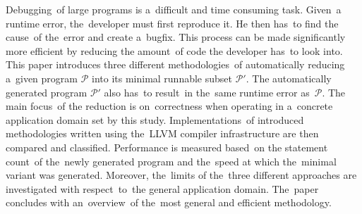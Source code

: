 \documentclass[12pt]{report}
\begin{document}

Debugging~of large programs is a~difficult and time consuming task.
Given~a runtime error, the~developer must first reproduce it. 
He then has~to find the cause~of the~error and create a~bugfix.
This process can be made significantly more efficient by reducing 
the amount~of code the developer has~to look into. 
This paper introduces three different methodologies~of automatically reducing
a~given program $\mathcal{P}$ into its minimal runnable subset $\mathcal{P'}$.
The automatically generated program $\mathcal{P'}$ also has~to 
result~in the~same runtime error as~$\mathcal{P}$.
The main focus~of the reduction is on~correctness when operating in a~concrete
application domain set by this study.
Implementations~of introduced methodologies written using the~LLVM compiler
infrastructure are then compared and classified.
Performance is measured based~on the statement count~of the~newly generated
program and the~speed at which the~minimal variant was generated.
Moreover, the~limits of the~three different approaches are investigated
with respect~to~the general application domain.
The~paper concludes with an~overview~of the~most general and efficient 
methodology.
\end{document}
